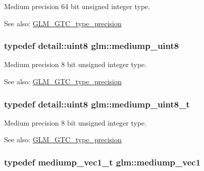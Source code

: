 Medium precision 64 bit unsigned integer type. \begin{Desc}
\item[See also:]\hyperlink{group__gtc__type__precision}{GLM\_\-GTC\_\-type\_\-precision} \end{Desc}
\hypertarget{group__gtc__type__precision_gc4b849eaac0543a10f97f4bdda4850a8}{
\subsubsection[mediump\_\-uint8]{\setlength{\rightskip}{0pt plus 5cm}typedef detail::uint8 {\bf glm::mediump\_\-uint8}}}
\label{group__gtc__type__precision_gc4b849eaac0543a10f97f4bdda4850a8}


Medium precision 8 bit unsigned integer type. \begin{Desc}
\item[See also:]\hyperlink{group__gtc__type__precision}{GLM\_\-GTC\_\-type\_\-precision} \end{Desc}
\hypertarget{group__gtc__type__precision_gdfa38f3c245d371c4b2079f1fd68928b}{
\subsubsection[mediump\_\-uint8\_\-t]{\setlength{\rightskip}{0pt plus 5cm}typedef detail::uint8 {\bf glm::mediump\_\-uint8\_\-t}}}
\label{group__gtc__type__precision_gdfa38f3c245d371c4b2079f1fd68928b}


Medium precision 8 bit unsigned integer type. \begin{Desc}
\item[See also:]\hyperlink{group__gtc__type__precision}{GLM\_\-GTC\_\-type\_\-precision} \end{Desc}
\hypertarget{group__gtc__type__precision_g1b734d715033ab3026b2fb27e1fb7d3e}{
\subsubsection[mediump\_\-vec1]{\setlength{\rightskip}{0pt plus 5cm}typedef mediump\_\-vec1\_\-t {\bf glm::mediump\_\-vec1}}}
\label{group__gtc__type__precision_g1b734d715033ab3026b2fb27e1fb7d3e}


